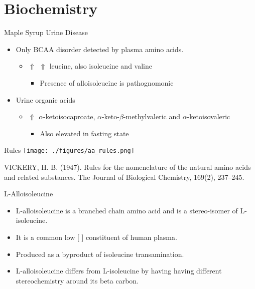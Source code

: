 \documentclass[presentation, smaller]{beamer}
\begin{document}
\section{Biochemistry}
\label{sec:orgheadline13}
\begin{frame}[label={sec:orgheadline4}]{Maple Syrup Urine Disease}
\begin{itemize}
\item Only BCAA disorder detected by plasma amino acids.
\begin{itemize}
\item \(\Uparrow\) \(\Uparrow\) leucine, also isoleucine and valine
\begin{itemize}
\item Presence of alloisoleucine is pathognomonic
\end{itemize}
\end{itemize}
\item Urine organic acids
\begin{itemize}
\item \(\Uparrow\) \(\alpha\)-ketoisocaproate,
\(\alpha\)-keto-\(\beta\)-methylvaleric and \(\alpha\)-ketoisovaleric
\begin{itemize}
\item Also elevated in fasting state
\end{itemize}
\end{itemize}
\end{itemize}
\end{frame}
\begin{frame}[label={sec:orgheadline5}]{Rules}
\texttt{[image: ./figures/aa\_rules.png]}


VICKERY, H. B. (1947). Rules for the nomenclature of the natural amino
acids and related substances. The Journal of Biological Chemistry,
169(2), 237–245.
\end{frame}
\begin{frame}[label={sec:orgheadline6}]{L-Alloisoleucine}
\begin{itemize}
\item L-alloisoleucine is a branched chain amino acid and is a
stereo-isomer of L-isoleucine.
\item It is a common low [ ] constituent of human plasma.
\item Produced as a byproduct of isoleucine transamination.
\item L-alloisoleucine differs from L-isoleucine by having having
different stereochemistry around its beta carbon.
\end{itemize}

\centering
{}
\end{frame}
\end{document}
